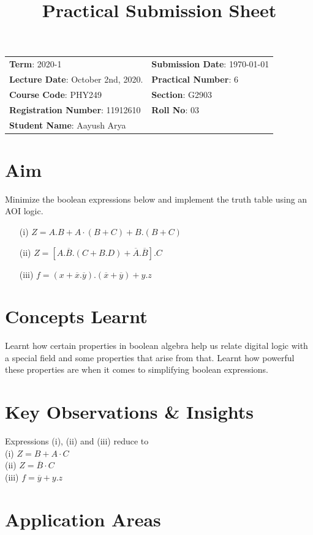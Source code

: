 \documentclass{article}
\title{Practical Submission Sheet}
\date{}
\newcommand{\bb}[1]{\textbf{#1}}
\newcommand{\ol}[1]{\overline{#1}}
\begin{document}
	\maketitle
	\begin{tabular}{ll}
		\bb{Term}: 2020-1 & \bb{Submission Date}: \today\\
		\bb{Lecture Date}: October 2nd, 2020. & \bb{Practical Number}: 6\\
		\bb{Course Code}: PHY249 & \bb{Section}: G2903\\
		\bb{Registration Number}: 11912610 & \bb{Roll No}: 03\\
		\bb{Student Name}: Aayush Arya & \\
	\end{tabular}
	
	\section*{Aim} Minimize the boolean expressions below and implement the truth table using an AOI logic.
	\begin{itemize}
		\item[(i)] $Z = A.B + A\cdot(B+C) + B.(B+C)$
		\item[(ii)] $Z = [A.\overline{B}.(C+B.D) + \overline{A}.\overline{B}].C$
		\item[(iii)] $f = (x+\overline{x}.\overline{y}).(\overline{x}+\overline{y}) + y.z$
	\end{itemize}
	\section*{Concepts Learnt}
	Learnt how certain properties in boolean algebra help us relate digital logic with a special field and some properties that arise from that. Learnt how powerful these properties are when it comes to simplifying boolean expressions.	
	
	\section*{Key Observations \& Insights}
	Expressions (i), (ii) and (iii) reduce to\\
	(i) $Z = B + A\cdot C$\\
	(ii) $Z = \ol{B} \cdot C$\\
	(iii) $f = \ol{y} + y.z$\\
	
	\section*{Application Areas}
	
\end{document}
